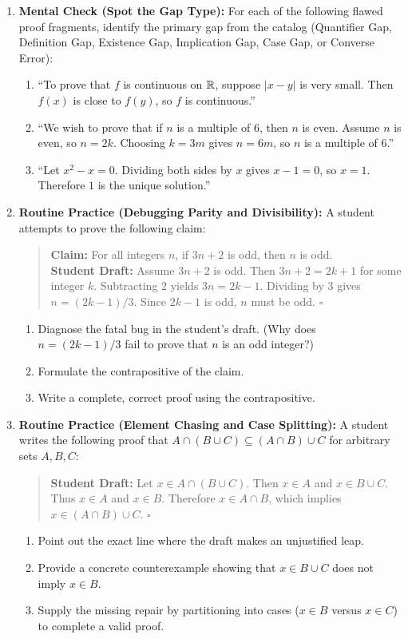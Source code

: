 \begin{enumerate}
\item \textbf{Mental Check (Spot the Gap Type):} For each of the following flawed proof fragments, identify the primary gap from the catalog (Quantifier Gap, Definition Gap, Existence Gap, Implication Gap, Case Gap, or Converse Error):
\begin{enumerate}[label=(\alph*)]
\item ``To prove that $f$ is continuous on $\mathbb{R}$, suppose $|x - y|$ is very small. Then $f(x)$ is close to $f(y)$, so $f$ is continuous.''
\item ``We wish to prove that if $n$ is a multiple of $6$, then $n$ is even. Assume $n$ is even, so $n = 2k$. Choosing $k = 3m$ gives $n = 6m$, so $n$ is a multiple of $6$.''
\item ``Let $x^2 - x = 0$. Dividing both sides by $x$ gives $x - 1 = 0$, so $x = 1$. Therefore $1$ is the unique solution.''
\end{enumerate}

\item \textbf{Routine Practice (Debugging Parity and Divisibility):} A student attempts to prove the following claim:
\begin{quote}
\textbf{Claim:} For all integers $n$, if $3n + 2$ is odd, then $n$ is odd.\\
\textbf{Student Draft:} Assume $3n + 2$ is odd. Then $3n + 2 = 2k + 1$ for some integer $k$. Subtracting $2$ yields $3n = 2k - 1$. Dividing by $3$ gives $n = (2k - 1)/3$. Since $2k - 1$ is odd, $n$ must be odd. \hfill $\square$
\end{quote}
\begin{enumerate}[label=(\alph*)]
\item Diagnose the fatal bug in the student's draft. (Why does $n = (2k - 1)/3$ fail to prove that $n$ is an odd integer?)
\item Formulate the contrapositive of the claim.
\item Write a complete, correct proof using the contrapositive.
\end{enumerate}

\item \textbf{Routine Practice (Element Chasing and Case Splitting):} A student writes the following proof that $A \cap (B \cup C) \subseteq (A \cap B) \cup C$ for arbitrary sets $A, B, C$:
\begin{quote}
\textbf{Student Draft:} Let $x \in A \cap (B \cup C)$. Then $x \in A$ and $x \in B \cup C$. Thus $x \in A$ and $x \in B$. Therefore $x \in A \cap B$, which implies $x \in (A \cap B) \cup C$. \hfill $\square$
\end{quote}
\begin{enumerate}[label=(\alph*)]
\item Point out the exact line where the draft makes an unjustified leap.
\item Provide a concrete counterexample showing that $x \in B \cup C$ does not imply $x \in B$.
\item Supply the missing repair by partitioning into cases ($x \in B$ versus $x \in C$) to complete a valid proof.
\end{enumerate}


\end{enumerate}
